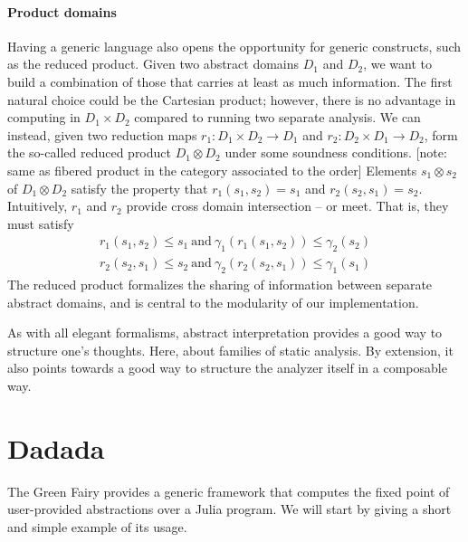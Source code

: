 \documentclass[11pt]{article}
\begin{document}
\paragraph{Product domains} Having a generic language also opens the opportunity for generic constructs, such as the reduced product. Given two abstract domains $D_1$ and $D_2$, we want to build a combination of those that carries at least as much information. The first natural choice could be the Cartesian product; however, there is no advantage in computing in $D_1\times D_2$ compared to running two separate analysis. We can instead, given two reduction maps $r_1:D_1\times D_2\to D_1$ and $r_2:D_2\times D_1\to D_2$, form the so-called reduced product $D_1 \otimes D_2$ under some soundness conditions. [note: same as fibered product in the category associated to the order] Elements $s_1\otimes s_2$ of $D_1 \otimes D_2$ satisfy the property that $r_1(s_1,s_2) = s_1$ and $r_2(s_2,s_1) = s_2$. Intuitively, $r_1$ and $r_2$ provide cross domain intersection -- or meet. That is, they must satisfy 
\begin{align*}
r_1(s_1,s_2) \leq s_1~\text{and}~ \gamma_1(r_1(s_1,s_2)) \leq \gamma_2(s_2) \\
r_2(s_2,s_1) \leq s_2~\text{and}~ \gamma_2(r_2(s_2,s_1)) \leq \gamma_1(s_1)
\end{align*}
The reduced product formalizes the sharing of information between separate abstract domains, and is central to the modularity of our implementation.

As with all elegant formalisms, abstract interpretation provides a good way to structure one's thoughts. Here, about families of static analysis.  By extension, it also points towards a good way to structure the analyzer itself in a composable way.

\section*{Dadada}

The Green Fairy provides a generic framework that computes the fixed point of user-provided abstractions over a Julia program. We will start by giving a short and simple example of its usage.
\end{document}
